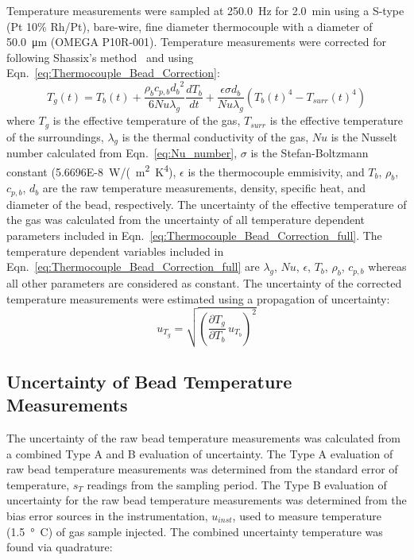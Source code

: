 \documentclass[12pt]{article}
\begin{document}
Temperature measurements were sampled at \SI{250.0}{Hz} for \SI{2.0}{min} using a S-type (Pt 10\% Rh/Pt), bare-wire, fine diameter thermocouple with a diameter of \SI{50.0}{\micro\metre} (OMEGA P10R-001). Temperature measurements were corrected for following Shassix's method~\cite{Shaddix1999} and using Eqn.~\ref{eq:Thermocouple_Bead_Correction}:
\begin{equation}\label{eq:Thermocouple_Bead_Correction_full}
{T_{g}(t)}= T_{b}(t)+{\frac{\rho_{b}c_{p,b}{d_{b}}^2}{6Nu\lambda_{g}}}\frac{dT_{b}}{dt}+\frac{\epsilon\sigma d_{b}}{Nu \lambda_{g}}\left({T_{b}(t)}^4-{T_{surr}(t)}^4\right)
\end{equation}
where $T_{g}$ is the effective temperature of the gas, $T_{surr}$ is the effective temperature of the surroundings, $\lambda_{g}$ is the thermal conductivity of the gas, $Nu$ is the Nusselt number calculated from Eqn.~\ref{eq:Nu_number}, $\sigma$ is the Stefan-Boltzmann constant (\SI{5.6696E-8}{W/(m^2~K^4}), $\epsilon$ is the thermocouple emmisivity, and $T_{b}$, $\rho_{b}$, $c_{p,b}$, $d_{b}$ are the raw temperature measurements, density, specific heat, and diameter of the bead, respectively. The uncertainty of the effective temperature of the gas was calculated from the uncertainty of all temperature dependent parameters included in Eqn.~\ref{eq:Thermocouple_Bead_Correction_full}. The temperature dependent variables included in Eqn.~\ref{eq:Thermocouple_Bead_Correction_full} are $\lambda_{g}$, $Nu$, $\epsilon$, $T_{b}$, $\rho_{b}$, $c_{p,b}$ whereas all other parameters are considered as constant. The uncertainty of the corrected temperature measurements were estimated using a propagation of uncertainty:
 \begin{equation}
\label{eq:temperature_corr_uncer}
u_{\scriptscriptstyle T_{g}} = \sqrt{{\left(\frac{\partial T_{g}}{\partial T_{b}}\,u_{\scriptscriptstyle T_{b}} \right)}^2}
\end{equation}

\subsection{Uncertainty of Bead Temperature Measurements}
\label{ssec:Uncertain_Bead_Temp_Measurements}
The uncertainty of the raw bead temperature measurements was calculated from a combined Type A and B evaluation of uncertainty. The Type A evaluation of raw bead temperature measurements was determined from the standard error of temperature, $s_{T}$ readings from the sampling period. The Type B evaluation of uncertainty for the raw bead temperature measurements was determined from the bias error sources in the instrumentation, $u_{inst}$, used to measure temperature (\SI{1.5}{\degree C}) of gas sample injected. The combined uncertainty temperature was found via quadrature:
\end{document}
